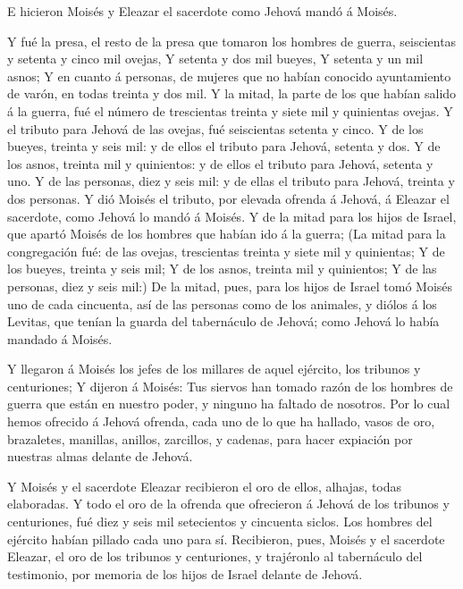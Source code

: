 E hicieron Moisés y Eleazar el sacerdote como Jehová mandó
á Moisés.

 Y fué la presa, el resto de la presa que tomaron los
hombres de guerra, seiscientas y setenta y cinco mil ovejas,
 Y setenta y dos mil bueyes,  Y setenta y un
mil asnos;  Y en cuanto á personas, de mujeres que no
habían conocido ayuntamiento de varón, en todas treinta y dos mil.
 Y la mitad, la parte de los que habían salido á la guerra,
fué el número de trescientas treinta y siete mil y quinientas ovejas.
 Y el tributo para Jehová de las ovejas, fué seiscientas
setenta y cinco.  Y de los bueyes, treinta y seis mil: y de
ellos el tributo para Jehová, setenta y dos.  Y de los
asnos, treinta mil y quinientos: y de ellos el tributo para Jehová,
setenta y uno.  Y de las personas, diez y seis mil: y de
ellas el tributo para Jehová, treinta y dos personas.  Y
dió Moisés el tributo, por elevada ofrenda á Jehová, á Eleazar el
sacerdote, como Jehová lo mandó á Moisés.  Y de la mitad
para los hijos de Israel, que apartó Moisés de los hombres que habían
ido á la guerra;  (La mitad para la congregación fué: de
las ovejas, trescientas treinta y siete mil y quinientas; 
Y de los bueyes, treinta y seis mil;  Y de los asnos,
treinta mil y quinientos;  Y de las personas, diez y seis
mil:)  De la mitad, pues, para los hijos de Israel tomó
Moisés uno de cada cincuenta, así de las personas como de los animales,
y diólos á los Levitas, que tenían la guarda del tabernáculo de Jehová;
como Jehová lo había mandado á Moisés.

 Y llegaron á Moisés los jefes de los millares de aquel
ejército, los tribunos y centuriones;  Y dijeron á Moisés:
Tus siervos han tomado razón de los hombres de guerra que están en
nuestro poder, y ninguno ha faltado de nosotros.  Por lo
cual hemos ofrecido á Jehová ofrenda, cada uno de lo que ha hallado,
vasos de oro, brazaletes, manillas, anillos, zarcillos, y cadenas, para
hacer expiación por nuestras almas delante de Jehová.

 Y Moisés y el sacerdote Eleazar recibieron el oro de
ellos, alhajas, todas elaboradas.  Y todo el oro de la
ofrenda que ofrecieron á Jehová de los tribunos y centuriones, fué diez
y seis mil setecientos y cincuenta siclos.  Los hombres del
ejército habían pillado cada uno para sí.  Recibieron,
pues, Moisés y el sacerdote Eleazar, el oro de los tribunos y
centuriones, y trajéronlo al tabernáculo del testimonio, por memoria de
los hijos de Israel delante de Jehová.

